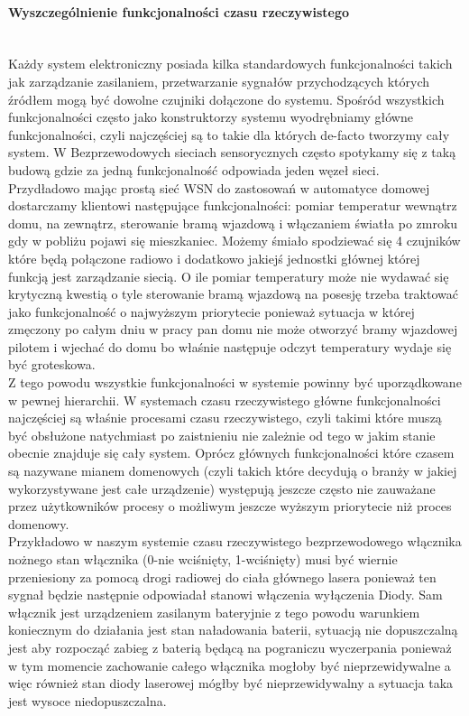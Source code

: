 \paragraph{Wyszczególnienie funkcjonalności czasu rzeczywistego} \mbox{}\\
\tab Każdy system elektroniczny posiada kilka standardowych funkcjonalności takich jak zarządzanie zasilaniem, przetwarzanie sygnałów przychodzących których źródłem mogą być dowolne czujniki dołączone do systemu.
Spośród wszystkich funkcjonalności często jako konstruktorzy systemu wyodrębniamy główne funkcjonalności, czyli najczęściej są to takie dla których de-facto tworzymy cały system. W Bezprzewodowych sieciach sensorycznych często spotykamy się z taką budową gdzie za jedną funkcjonalność odpowiada jeden węzeł sieci. \\
Przydładowo mając prostą sieć WSN do zastosowań w automatyce domowej dostarczamy klientowi następujące funkcjonalności: pomiar temperatur wewnątrz domu, na zewnątrz, sterowanie bramą wjazdową i włączaniem światła po zmroku gdy w pobliżu pojawi się mieszkaniec. Możemy śmiało spodziewać się 4 czujników które będą połączone radiowo i dodatkowo jakiejś jednostki głównej której funkcją jest zarządzanie siecią. O ile pomiar temperatury może nie wydawać się krytyczną kwestią o tyle sterowanie bramą wjazdową na posesję trzeba traktować jako funkcjonalność o najwyższym priorytecie ponieważ sytuacja w której zmęczony po całym dniu w pracy pan domu nie może otworzyć bramy wjazdowej pilotem i wjechać do domu bo właśnie następuje odczyt temperatury wydaje się być groteskowa. \\
Z tego powodu wszystkie funkcjonalności w systemie powinny być uporządkowane w pewnej hierarchii. 
W systemach czasu rzeczywistego główne funkcjonalności najczęściej są właśnie procesami czasu rzeczywistego, czyli takimi które muszą być obsłużone natychmiast po zaistnieniu nie zależnie od tego w jakim stanie obecnie znajduje się cały system.
Oprócz głównych funkcjonalności które czasem są nazywane mianem domenowych (czyli takich które decydują o branży w jakiej wykorzystywane jest całe urządzenie) występują jeszcze często nie zauważane przez użytkowników procesy o możliwym jeszcze wyższym priorytecie niż proces domenowy. \\
Przykładowo w naszym systemie czasu rzeczywistego bezprzewodowego włącznika nożnego stan włącznika (0-nie wciśnięty, 1-wciśnięty) musi być wiernie przeniesiony za pomocą drogi radiowej do ciała głównego lasera ponieważ ten sygnał będzie następnie odpowiadał stanowi włączenia wyłączenia Diody. Sam włącznik jest urządzeniem zasilanym bateryjnie z tego powodu warunkiem koniecznym do działania jest stan naładowania baterii, sytuacją nie dopuszczalną jest aby rozpocząć zabieg z baterią będącą na pograniczu wyczerpania ponieważ w tym momencie zachowanie całego włącznika mogłoby być nieprzewidywalne a więc również stan diody laserowej mógłby być nieprzewidywalny a sytuacja taka jest wysoce niedopuszczalna.
